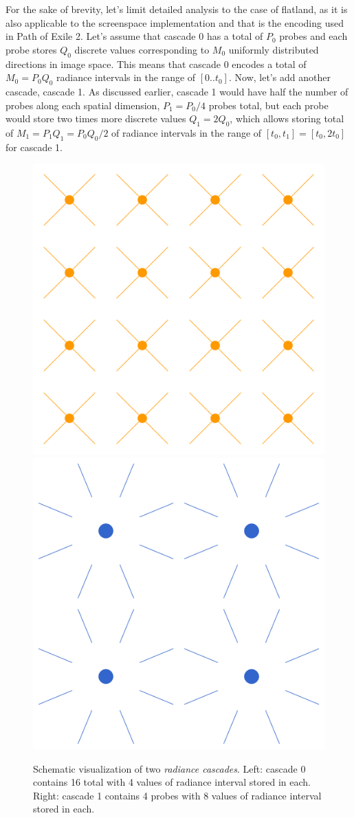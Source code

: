 \documentclass{jcgt}
\begin{document}
For the sake of brevity, let's limit detailed analysis to the case of flatland, as it is also applicable to the screenspace implementation and that is the encoding used in Path of Exile 2.
Let's assume that cascade 0 has a total of $P_0$ probes and each probe stores $Q_0$ discrete values corresponding to $M_0$ uniformly distributed directions in image space. This means that cascade 0 encodes a total of $M_0=P_0Q_0$ radiance intervals in the range of $[0..t_0]$. Now, let's add another cascade, cascade 1. As discussed earlier, cascade 1 would have half the number of probes along each spatial dimension, $P_1=P_0/4$ probes total, but each probe would store two times more discrete values $Q_1=2Q_0$, which allows storing total of $M_1=P_1Q_1=P_0Q_0/2$ of radiance intervals in the range of $[t_0,t_1]=[t_0,2t_0]$ for cascade 1.


\begin{figure}[htb]
  \centering
  \includegraphics[width=0.49\columnwidth]{images/cascade 0.png}
  \includegraphics[width=0.49\columnwidth]{images/cascade 1.png}
  \caption{\label{fig:cascades}
     Schematic visualization of two \emph{radiance cascades}. Left: cascade 0 contains 16 total with 4 values of radiance interval stored in each. Right: cascade 1 contains 4 probes with 8 values of radiance interval stored in each.}
\end{figure}
\end{document}
